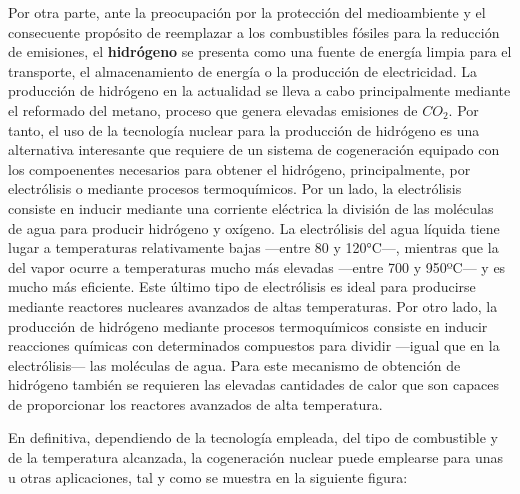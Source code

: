 Por otra parte, ante la preocupación por la protección del medioambiente y el consecuente propósito de reemplazar a los combustibles fósiles para la reducción de emisiones, el \textbf{hidrógeno} se presenta como una fuente de energía limpia para el transporte, el almacenamiento de energía o la producción de electricidad. La producción de hidrógeno en la actualidad se lleva a cabo principalmente mediante el reformado del metano, proceso que genera elevadas emisiones de $CO_2$. Por tanto, el uso de la tecnología nuclear para la producción de hidrógeno es una alternativa interesante que requiere de un sistema de cogeneración equipado con los compoenentes necesarios para obtener el hidrógeno, principalmente, por electrólisis o mediante procesos termoquímicos. Por un lado, la electrólisis consiste en inducir mediante una corriente eléctrica la división de las moléculas de agua para producir hidrógeno y oxígeno. La electrólisis del agua líquida tiene lugar a temperaturas relativamente bajas ---entre 80 y 120°C---, mientras que la del vapor ocurre a temperaturas mucho más elevadas ---entre 700 y 950ºC--- y es mucho más eficiente. Este último tipo de electrólisis es ideal para producirse mediante reactores nucleares avanzados de altas temperaturas. Por otro lado, la producción de hidrógeno mediante procesos termoquímicos consiste en inducir reacciones químicas con determinados compuestos para dividir ---igual que en la electrólisis--- las moléculas de agua. Para este mecanismo de obtención de hidrógeno también se requieren las elevadas cantidades de calor que son capaces de proporcionar los reactores avanzados de alta temperatura.

En definitiva, dependiendo de la tecnología empleada, del tipo de combustible y de la temperatura alcanzada, la cogeneración nuclear puede emplearse para unas u otras aplicaciones, tal y como se muestra en la siguiente figura:

